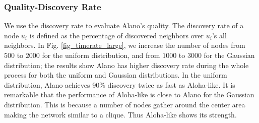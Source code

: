 \subsubsection{Quality-Discovery Rate}






We use the discovery rate to evaluate Alano's quality.
The discovery rate of a node $u_i$ is defined as the percentage of discovered neighbors over $u_i$'s all neighbors.
In Fig. \ref{fig_timerate_large}, we increase the number of nodes from
$500$ to $2000$ for the uniform distribution, and %
from $1000$ to $3000$ for the Gaussian distribution; the results
show Alano has higher discovery rate during the whole process for
both the uniform and Gaussian distributions. In the uniform distribution,
Alano achieves 90\% discovery twice as fast as Aloha-like. It is
remarkable that the performance of Aloha-like is close to Alano for the
Gaussian distribution. This is because a number of nodes gather around
the center area making the network similar to a clique. Thus
Aloha-like shows its strength.





